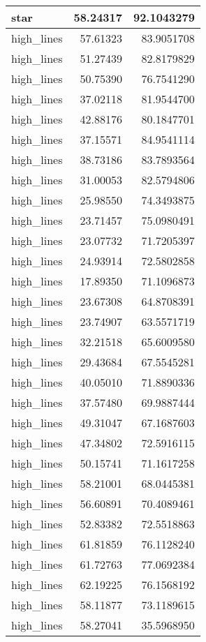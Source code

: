 \documentclass[
]{book}
\theoremstyle{definition}
\theoremstyle{definition}
\theoremstyle{definition}
\theoremstyle{definition}
\theoremstyle{remark}
\begin{document}
\begin{tabular}{l|r|r}
\hline
star & 58.24317 & 92.1043279\\
\hline
high\_lines & 57.61323 & 83.9051708\\
\hline
high\_lines & 51.27439 & 82.8179829\\
\hline
high\_lines & 50.75390 & 76.7541290\\
\hline
high\_lines & 37.02118 & 81.9544700\\
\hline
high\_lines & 42.88176 & 80.1847701\\
\hline
high\_lines & 37.15571 & 84.9541114\\
\hline
high\_lines & 38.73186 & 83.7893564\\
\hline
high\_lines & 31.00053 & 82.5794806\\
\hline
high\_lines & 25.98550 & 74.3493875\\
\hline
high\_lines & 23.71457 & 75.0980491\\
\hline
high\_lines & 23.07732 & 71.7205397\\
\hline
high\_lines & 24.93914 & 72.5802858\\
\hline
high\_lines & 17.89350 & 71.1096873\\
\hline
high\_lines & 23.67308 & 64.8708391\\
\hline
high\_lines & 23.74907 & 63.5571719\\
\hline
high\_lines & 32.21518 & 65.6009580\\
\hline
high\_lines & 29.43684 & 67.5545281\\
\hline
high\_lines & 40.05010 & 71.8890336\\
\hline
high\_lines & 37.57480 & 69.9887444\\
\hline
high\_lines & 49.31047 & 67.1687603\\
\hline
high\_lines & 47.34802 & 72.5916115\\
\hline
high\_lines & 50.15741 & 71.1617258\\
\hline
high\_lines & 58.21001 & 68.0445381\\
\hline
high\_lines & 56.60891 & 70.4089461\\
\hline
high\_lines & 52.83382 & 72.5518863\\
\hline
high\_lines & 61.81859 & 76.1128240\\
\hline
high\_lines & 61.72763 & 77.0692384\\
\hline
high\_lines & 62.19225 & 76.1568192\\
\hline
high\_lines & 58.11877 & 73.1189615\\
\hline
high\_lines & 58.27041 & 35.5968950\\

\end{tabular}
\end{document}
